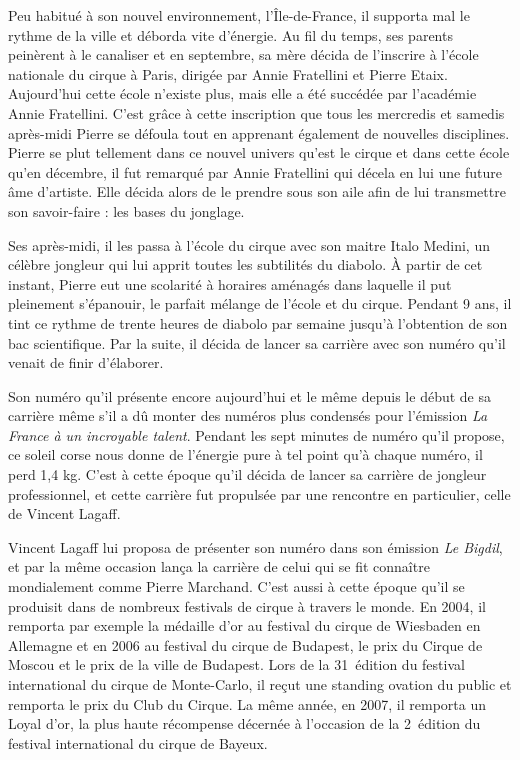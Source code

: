 Peu habitué à son nouvel environnement, l'Île-de-France, il supporta mal le rythme de la ville et déborda vite d'énergie. Au fil du temps, ses parents peinèrent à le canaliser et en septembre, sa mère décida de l'inscrire à l'école nationale du cirque à Paris, dirigée par Annie Fratellini et Pierre Etaix. Aujourd'hui cette école n'existe plus, mais elle a été succédée par l'académie Annie Fratellini. C'est grâce à cette inscription que tous les mercredis et samedis après-midi Pierre se défoula tout en apprenant également de nouvelles disciplines. Pierre se plut tellement dans ce nouvel univers qu'est le cirque et dans cette école qu'en décembre, il fut remarqué par Annie Fratellini qui décela en lui une future âme d'artiste. Elle décida alors de le prendre sous son aile afin de lui transmettre son savoir-faire : les bases du jonglage.

Ses après-midi, il les passa à l'école du cirque avec son maitre Italo Medini, un célèbre jongleur qui lui apprit toutes les subtilités du diabolo. À partir de cet instant, Pierre eut une scolarité à horaires aménagés dans laquelle il put pleinement s'épanouir, le parfait mélange de l'école et du cirque. Pendant 9 ans, il tint ce rythme de trente heures de diabolo par semaine jusqu'à l'obtention de son bac scientifique. Par la suite, il décida de lancer sa carrière avec son numéro qu’il venait de finir d'élaborer.

Son numéro qu'il présente encore aujourd'hui et le même depuis le début de sa carrière même s'il a dû monter des numéros plus condensés pour l'émission \textit{La France à un incroyable talent}. Pendant les sept minutes de numéro qu'il propose, ce soleil corse nous donne de l'énergie pure à tel point qu'à chaque numéro, il perd 1,4 kg. C'est à cette époque qu'il décida de lancer sa carrière de jongleur professionnel, et cette carrière fut propulsée par une rencontre en particulier, celle de Vincent Lagaff.

Vincent Lagaff lui proposa de présenter son numéro dans son émission \textit{Le Bigdil}, et par la même occasion lança la carrière de celui qui se fit connaître mondialement comme Pierre Marchand. C'est aussi à cette époque qu'il se produisit dans de nombreux festivals de cirque à travers le monde. En 2004, il remporta par exemple la médaille d'or au festival du cirque de Wiesbaden en Allemagne et en 2006 au festival du cirque de Budapest, le prix du Cirque de Moscou et le prix de la ville de Budapest. Lors de la 31\ieme~édition du festival international du cirque de Monte-Carlo, il reçut une standing ovation du public et remporta le prix du Club du Cirque. La même année, en 2007, il remporta un Loyal d'or, la plus haute récompense décernée à l'occasion de la 2\ieme~édition du festival international du cirque de Bayeux.


